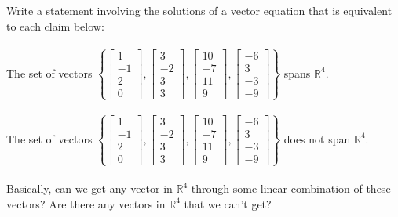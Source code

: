 \documentclass{article}
\begin{document}
{Write a statement involving the solutions of a vector equation that is equivalent to each claim below:\\
\\
The set of vectors $\left\{
 \left[\begin{matrix} 1 \\ -1 \\ 2 \\ 0 \end{matrix}\right],
 \left[\begin{matrix} 3 \\ -2 \\ 3 \\ 3 \end{matrix}\right],
 \left[\begin{matrix} 10 \\ -7 \\ 11 \\ 9 \end{matrix}\right],
 \left[\begin{matrix} -6 \\ 3 \\ -3 \\ -9 \end{matrix}\right]
 \right\}$ spans $\mathbb{R}^{4}$.\\
\\
The set of vectors $\left\{
 \left[\begin{matrix} 1 \\ -1 \\ 2 \\ 0 \end{matrix}\right],
 \left[\begin{matrix} 3 \\ -2 \\ 3 \\ 3 \end{matrix}\right],
 \left[\begin{matrix} 10 \\ -7 \\ 11 \\ 9 \end{matrix}\right],
 \left[\begin{matrix} -6 \\ 3 \\ -3 \\ -9 \end{matrix}\right]
 \right\}$ does not span $\mathbb{R}^{4}$.\\
\\
Basically, can we get any vector in $\mathbb{R}^{4}$ through some linear combination of these vectors? Are there any vectors in $\mathbb{R}^{4}$ that we can't get?\\
}
\end{document}
